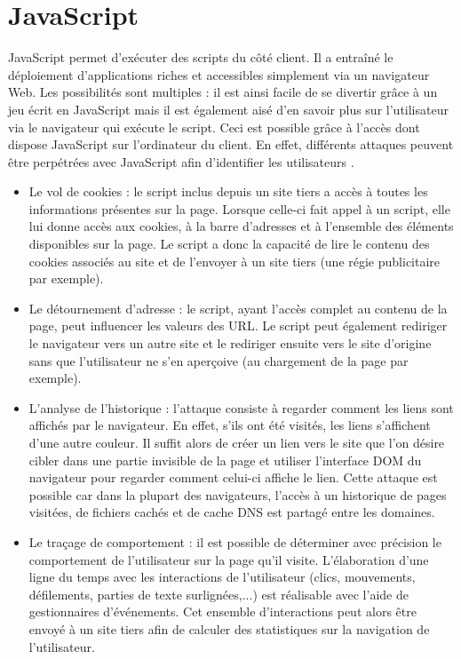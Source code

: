 \section{JavaScript}
JavaScript permet d'exécuter des scripts du côté client. Il a entraîné le déploiement d'applications riches et accessibles simplement via un navigateur Web. Les possibilités sont multiples : il est ainsi facile de se divertir grâce à un jeu écrit en JavaScript mais il est également aisé d'en savoir plus sur l'utilisateur via le navigateur qui exécute le script. Ceci est possible grâce à l'accès dont dispose JavaScript sur l'ordinateur du client. En effet, différents attaques peuvent être perpétrées avec JavaScript afin d'identifier les utilisateurs \cite{Jang:2010:ESP:1866307.1866339}.
\newline

\begin{itemize}
	\item Le vol de cookies : le script inclus depuis un site tiers a accès à toutes les informations présentes sur la page. Lorsque celle-ci fait appel à un script, elle lui donne accès aux cookies, à la barre d'adresses et à l'ensemble des éléments disponibles sur la page. Le script a donc la capacité de lire le contenu des cookies associés au site et de l'envoyer à un site tiers (une régie publicitaire par exemple).
	\item Le détournement d'adresse : le script, ayant l'accès complet au contenu de la page, peut influencer les valeurs des URL. Le script peut également rediriger le navigateur vers un autre site et le rediriger ensuite vers le site d'origine sans que l'utilisateur ne s'en aperçoive (au chargement de la page par exemple).
	\item L'analyse de l'historique : l'attaque consiste à regarder comment les liens sont affichés par le navigateur. En effet, s'ils ont été visités, les liens s'affichent d'une autre couleur. Il suffit alors de créer un lien vers le site que l'on désire cibler dans une partie invisible de la page et utiliser l'interface DOM du navigateur pour regarder comment celui-ci affiche le lien. Cette attaque est possible car dans la plupart des navigateurs, l'accès à un historique de pages visitées, de fichiers cachés et de cache DNS est partagé entre les domaines.
	\item Le traçage de comportement : il est possible de déterminer avec précision le comportement de l'utilisateur sur la page qu'il visite. L'élaboration d'une ligne du temps avec les interactions de l'utilisateur (clics, mouvements, défilements, parties de texte surlignées,...) est réalisable avec l'aide de gestionnaires d'événements. Cet ensemble d'interactions peut alors être envoyé à un site tiers afin de calculer des statistiques sur la navigation de l'utilisateur.
\end{itemize}

